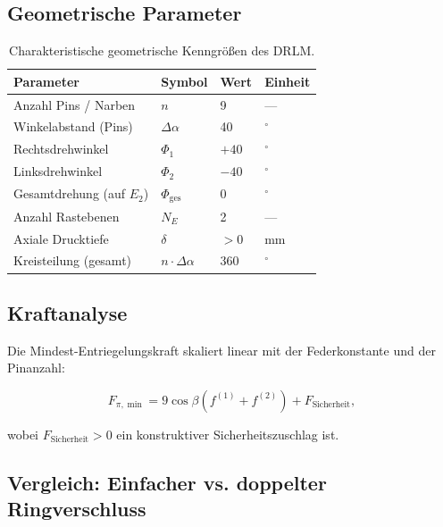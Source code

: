 ﻿\documentclass[12pt, a4paper]{article}
\theoremstyle{remark}
\begin{document}
\subsection{Geometrische Parameter}

\begin{table}[H]
  \centering
  \caption{Charakteristische geometrische Kenngrößen des DRLM.}
  \label{tab:parameter}
  \begin{tabular}{llll}
    \toprule
    \textbf{Parameter} & \textbf{Symbol} & \textbf{Wert} & \textbf{Einheit} \\
    \midrule
    Anzahl Pins / Narben & $n$ & 9 & --- \\
    Winkelabstand (Pins) & $\Delta\alpha$ & 40 & \(^\circ\) \\
    Rechtsdrehwinkel & $\Phi_1$ & $+40$ & \(^\circ\) \\
    Linksdrehwinkel & $\Phi_2$ & $-40$ & \(^\circ\) \\
    Gesamtdrehung (auf $E_2$) & $\Phi_{\text{ges}}$ & 0 & \(^\circ\) \\
    Anzahl Rastebenen & $N_E$ & 2 & --- \\
    Axiale Drucktiefe & $\delta$ & $>0$ & mm \\
    Kreisteilung (gesamt) & $n \cdot \Delta\alpha$ & 360 & \(^\circ\) \\
    \bottomrule
  \end{tabular}
\end{table}

\subsection{Kraftanalyse}

Die Mindest-Entriegelungskraft skaliert linear mit der Federkonstante und der Pinanzahl:

\begin{equation}
  F_{\pi,\min} = 9\cos\beta \left(f^{(1)} + f^{(2)}\right) + F_{\text{Sicherheit}},
\end{equation}

wobei $F_{\text{Sicherheit}} > 0$ ein konstruktiver Sicherheitszuschlag ist.

\subsection{Vergleich: Einfacher vs. doppelter Ringverschluss}
\end{document}
